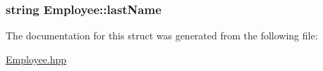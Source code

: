 \subsubsection[{\texorpdfstring{last\+Name}{lastName}}]{\setlength{\rightskip}{0pt plus 5cm}string Employee\+::last\+Name}\hypertarget{structEmployee_a267bc468161a6e5031bf03c6c3dcc27b}{}\label{structEmployee_a267bc468161a6e5031bf03c6c3dcc27b}


The documentation for this struct was generated from the following file\+:\begin{DoxyCompactItemize}
\item 
\hyperlink{Employee_8hpp}{Employee.\+hpp}\end{DoxyCompactItemize}
